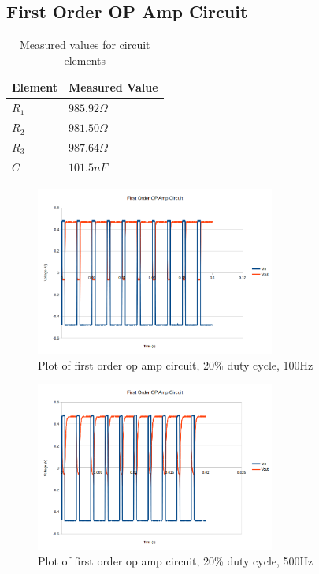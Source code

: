 \documentclass[10pt]{article}
\begin{document}
\subsection*{First Order OP Amp Circuit}
\begin{table}[H]
	\centering
	\begin{tabular}{ll}
		\hline
		\textbf{Element} & \textbf{Measured Value}\\
		\hline
		$R_1$ & $985.92 \Omega$\\
		$R_2$ & $981.50 \Omega$\\
		$R_3$ & $987.64 \Omega$\\
		$C$ & $101.5nF$\\
		\hline
	\end{tabular}
	\caption{Measured values for circuit elements}
\end{table}
\begin{figure}[H]
	\centering
	\includegraphics[width=0.7\textwidth]{OPAmp20_100}
	\caption{Plot of first order op amp circuit, 20\% duty cycle, 100Hz}
\end{figure}
\begin{figure}[H]
	\centering
	\includegraphics[width=0.7\textwidth]{OPAmp20_500}
	\caption{Plot of first order op amp circuit, 20\% duty cycle, 500Hz}
\end{figure}
\end{document}
